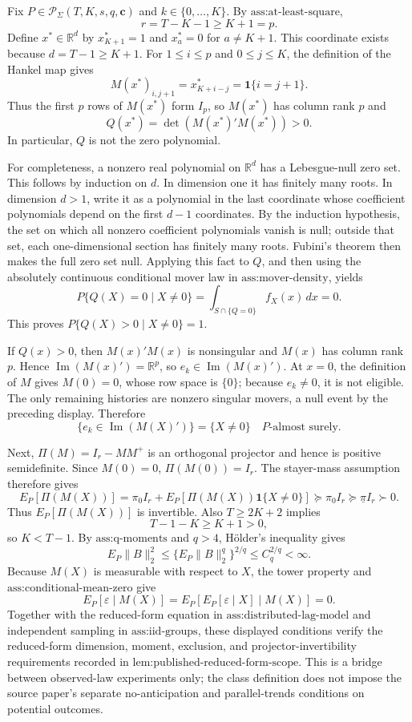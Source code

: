 Fix \(P\in\mathcal P_\Sigma(T,K,s,q,\mathbf c)\) and \(k\in\{0,\ldots,K\}\). By \(\text{ass:at-least-square}\),
\[
 r=T-K-1\ge K+1=p.
\]
Define \(x^*\in\mathbb R^d\) by \(x^*_{K+1}=1\) and \(x^*_a=0\) for \(a\ne K+1\). This coordinate exists because \(d=T-1\ge K+1\). For \(1\le i\le p\) and \(0\le j\le K\), the definition of the Hankel map gives
\[
 M(x^*)_{i,j+1}=x^*_{K+i-j}=\mathbf 1\{i=j+1\}.
\]
Thus the first \(p\) rows of \(M(x^*)\) form \(I_p\), so \(M(x^*)\) has column rank \(p\) and
\[
 Q(x^*)=\det(M(x^*)'M(x^*))>0.
\]
In particular, \(Q\) is not the zero polynomial.

For completeness, a nonzero real polynomial on \(\mathbb R^d\) has a Lebesgue-null zero set. This follows by induction on \(d\). In dimension one it has finitely many roots. In dimension \(d>1\), write it as a polynomial in the last coordinate whose coefficient polynomials depend on the first \(d-1\) coordinates. By the induction hypothesis, the set on which all nonzero coefficient polynomials vanish is null; outside that set, each one-dimensional section has finitely many roots. Fubini's theorem then makes the full zero set null. Applying this fact to \(Q\), and then using the absolutely continuous conditional mover law in \(\text{ass:mover-density}\), yields
\[
 P\{Q(X)=0\mid X\ne0\}
 =\int_{S\cap\{Q=0\}}f_X(x)\,dx=0.
\]
This proves \(P\{Q(X)>0\mid X\ne0\}=1\).

If \(Q(x)>0\), then \(M(x)'M(x)\) is nonsingular and \(M(x)\) has column rank \(p\). Hence \(\operatorname{Im}(M(x)')=\mathbb R^p\), so \(e_k\in\operatorname{Im}(M(x)')\). At \(x=0\), the definition of \(M\) gives \(M(0)=0\), whose row space is \(\{0\}\); because \(e_k\ne0\), it is not eligible. The only remaining histories are nonzero singular movers, a null event by the preceding display. Therefore
\[
 \{e_k\in\operatorname{Im}(M(X)')\}
 =\{X\ne0\}
 \quad P\text{-almost surely}.
\]

Next, \(\Pi(M)=I_r-MM^+\) is an orthogonal projector and hence is positive semidefinite. Since \(M(0)=0\), \(\Pi(M(0))=I_r\). The stayer-mass assumption therefore gives
\[
 E_P[\Pi(M(X))]
 =\pi_0 I_r+E_P[\Pi(M(X))\mathbf 1\{X\ne0\}]
 \succeq\pi_0I_r
 \succeq\underline\pi I_r
 \succ0.
\]
Thus \(E_P[\Pi(M(X))]\) is invertible. Also \(T\ge2K+2\) implies
\[
 T-1-K\ge K+1>0,
\]
so \(K<T-1\). By \(\text{ass:q-moments}\) and \(q>4\), Hölder's inequality gives
\[
 E_P\|B\|_2^2
 \le \{E_P\|B\|_2^q\}^{2/q}
 \le C_q^{2/q}<\infty.
\]
Because \(M(X)\) is measurable with respect to \(X\), the tower property and \(\text{ass:conditional-mean-zero}\) give
\[
 E_P[\varepsilon\mid M(X)]
 =E_P\!\left[E_P[\varepsilon\mid X]\mid M(X)\right]=0.
\]
Together with the reduced-form equation in \(\text{ass:distributed-lag-model}\) and independent sampling in \(\text{ass:iid-groups}\), these displayed conditions verify the reduced-form dimension, moment, exclusion, and projector-invertibility requirements recorded in \(\text{lem:published-reduced-form-scope}\). This is a bridge between observed-law experiments only; the class definition does not impose the source paper's separate no-anticipation and parallel-trends conditions on potential outcomes.

